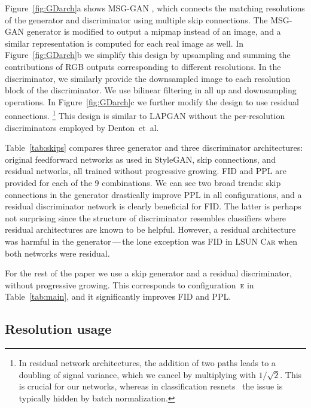 \documentclass[10pt,twocolumn,letterpaper]{article}
\newcommand{\arch}[1]{\textsc{#1}}
\newcommand{\FINAL}[2][]{#2} %
\begin{document}
Figure~\ref{fig:GDarch}a shows \FINAL{MSG-GAN \cite{Karnewar2019}}, which connects the matching resolutions of the generator and discriminator using multiple skip connections. 
The MSG-GAN generator is modified to output a mipmap \cite{Williams1983} instead of an image, and a similar representation is computed for each real image as well.
In Figure~\ref{fig:GDarch}b we simplify this design by upsampling and summing the contributions of RGB outputs corresponding to different resolutions. 
In the discriminator, we similarly provide the downsampled image to each resolution block of the discriminator.
We use bilinear filtering in all up and downsampling operations. 
In Figure~\ref{fig:GDarch}c we further modify the design to use residual connections.%
\footnote{In residual network architectures, the addition of two paths leads to a doubling of signal variance, which we cancel by multiplying with $1/\sqrt 2$. 
This is crucial for our networks, whereas in classification resnets~\cite{He2015b} the issue is typically hidden by batch normalization.}
This design is similar to LAPGAN \cite{Denton2015} without the per-resolution discriminators employed by Denton~et~al.

\tabskips %

Table~\ref{tab:skips} compares three generator and three discriminator architectures: original feedforward networks as used in StyleGAN, skip connections, and residual networks, all trained without progressive growing.
FID and PPL are provided for each of the 9 combinations.
We can see two broad trends: skip connections in the generator drastically improve PPL in all configurations, and a residual discriminator network is clearly beneficial for FID.
The latter is perhaps not surprising since the structure of discriminator resembles classifiers where residual architectures are known to be helpful. 
However, a residual architecture was harmful in the generator\,---\,the lone exception was FID in \textsc{LSUN Car} when both networks were residual. 

For the rest of the paper we use a skip generator and a residual discriminator, without progressive growing.
This corresponds to configuration~\arch{e} in Table~\ref{tab:main}, and it significantly improves FID and PPL. 

\subsection{Resolution usage}
\label{sec:resusage}

\figresolutionusage %
\end{document}
